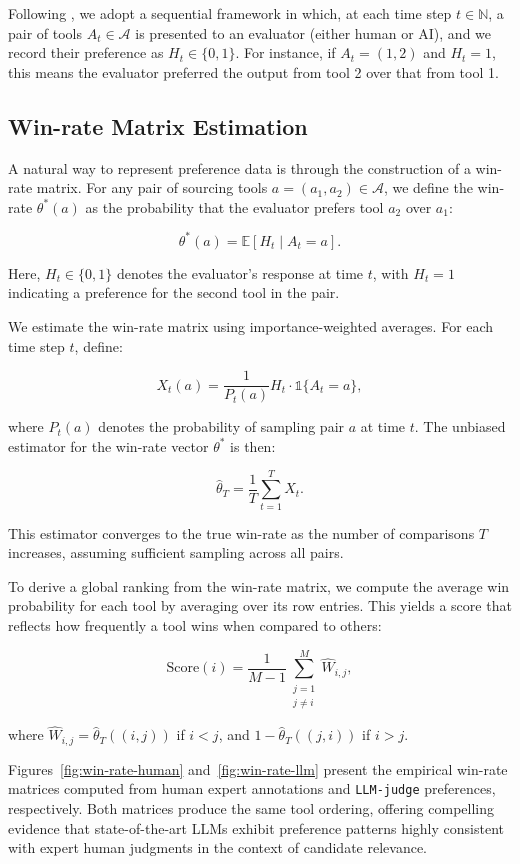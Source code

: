 \documentclass{article}
\begin{document}
Following \cite{chiang2024chatbot}, we adopt a sequential framework in which, at each time step $t \in \mathbb{N}$, a pair of tools $A_t \in \mathcal{A}$ is presented to an evaluator (either human or AI), and we record their preference as $H_t \in \{0,1\}$. For instance, if $A_t = (1, 2)$ and $H_t = 1$, this means the evaluator preferred the output from tool 2 over that from tool 1.

\subsection{Win-rate Matrix Estimation}

A natural way to represent preference data is through the construction of a win-rate matrix. For any pair of sourcing tools $a = (a_1, a_2) \in \mathcal{A}$, we define the win-rate $\theta^*(a)$ as the probability that the evaluator prefers tool $a_2$ over $a_1$:

\[
\theta^*(a) = \mathbb{E}[H_t \mid A_t = a].
\]

Here, $H_t \in \{0, 1\}$ denotes the evaluator's response at time $t$, with $H_t = 1$ indicating a preference for the second tool in the pair.

We estimate the win-rate matrix using importance-weighted averages. For each time step $t$, define:

\[
X_t(a) = \frac{1}{P_t(a)} H_t \cdot \mathbb{1}\{A_t = a\},
\]

where $P_t(a)$ denotes the probability of sampling pair $a$ at time $t$. The unbiased estimator for the win-rate vector $\theta^*$ is then:

\[
\hat{\theta}_T = \frac{1}{T} \sum_{t=1}^{T} X_t. \tag{4}
\]

This estimator converges to the true win-rate as the number of comparisons $T$ increases, assuming sufficient sampling across all pairs.

To derive a global ranking from the win-rate matrix, we compute the average win probability for each tool by averaging over its row entries. This yields a score that reflects how frequently a tool wins when compared to others:

\[
\text{Score}(i) = \frac{1}{M - 1} \sum_{\substack{j=1 \\ j \neq i}}^{M} \hat{W}_{i,j},
\]

where $\hat{W}_{i,j} = \hat{\theta}_T((i, j))$ if $i < j$, and $1 - \hat{\theta}_T((j, i))$ if $i > j$.

Figures~\ref{fig:win-rate-human} and~\ref{fig:win-rate-llm} present the empirical win-rate matrices computed from human expert annotations and \texttt{LLM-judge} preferences, respectively. Both matrices produce the same tool ordering, offering compelling evidence that state-of-the-art LLMs exhibit preference patterns highly consistent with expert human judgments in the context of candidate relevance.
\end{document}
